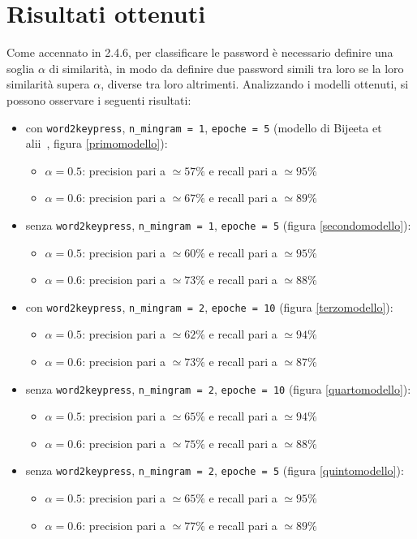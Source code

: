 \section{Risultati ottenuti}
Come accennato in 2.4.6, per classificare le password è necessario definire una soglia $\alpha$ di similarità, in modo da definire due password simili tra loro se la loro similarità supera $\alpha$, diverse tra loro altrimenti.
Analizzando i modelli ottenuti, si possono osservare i seguenti risultati:
\begin{itemize}
    \item con \texttt{word2keypress}, \texttt{n\_mingram = 1}, \texttt{epoche = 5} (modello di Bijeeta et
    \\alii~\cite{biijeta}, figura \ref{primomodello}):
    \begin{itemize}
        \item $\alpha = 0.5$: precision pari a $\simeq 57\%$ e recall pari a $\simeq 95\%$
        \item $\alpha = 0.6$: precision pari a $\simeq 67\%$ e recall pari a $\simeq 89\%$
    \end{itemize}
    \item senza \texttt{word2keypress}, \texttt{n\_mingram = 1}, \texttt{epoche = 5} (figura \ref{secondomodello}):
    \begin{itemize}
        \item $\alpha = 0.5$: precision pari a $\simeq 60\%$ e recall pari a $\simeq 95\%$
        \item $\alpha = 0.6$: precision pari a $\simeq 73\%$ e recall pari a $\simeq 88\%$
    \end{itemize}
    \item con \texttt{word2keypress}, \texttt{n\_mingram = 2}, \texttt{epoche = 10} (figura \ref{terzomodello}):
    \begin{itemize}
        \item $\alpha = 0.5$: precision pari a $\simeq 62\%$ e recall pari a $\simeq 94\%$
        \item $\alpha = 0.6$: precision pari a $\simeq 73\%$ e recall pari a $\simeq 87\%$
    \end{itemize}
    \item senza \texttt{word2keypress}, \texttt{n\_mingram = 2}, \texttt{epoche = 10} (figura \ref{quartomodello}):
    \begin{itemize}
        \item $\alpha = 0.5$: precision pari a $\simeq 65\%$ e recall pari a $\simeq 94\%$
        \item $\alpha = 0.6$: precision pari a $\simeq 75\%$ e recall pari a $\simeq 88\%$
    \end{itemize}
    \item senza \texttt{word2keypress}, \texttt{n\_mingram = 2}, \texttt{epoche = 5}
    (figura \ref{quintomodello}):
    \begin{itemize}
        \item $\alpha = 0.5$: precision pari a $\simeq 65\%$ e recall pari a $\simeq 95\%$
        \item $\alpha = 0.6$: precision pari a $\simeq 77\%$ e recall pari a $\simeq 89\%$
    \end{itemize}
\end{itemize}
